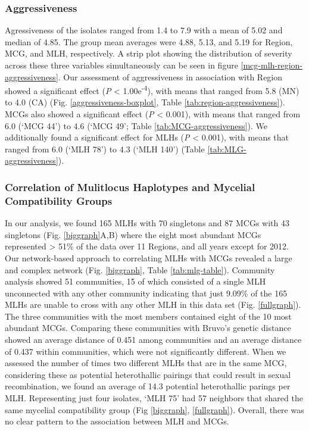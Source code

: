 \documentclass[fleqn,10pt,lineno]{wlpeerj} %
\theoremstyle{definition}
\theoremstyle{definition}
\theoremstyle{definition}
\theoremstyle{remark}
\begin{document}
\subsubsection*{Aggressiveness}\label{aggressiveness-1}

Agressiveness of the isolates ranged from 1.4 to 7.9 with a mean of 5.02
and median of 4.85. The group mean averages were 4.88, 5.13, and 5.19
for Region, MCG, and MLH, respectively. A strip plot showing the
distribution of severity across these three variables simultaneously can
be seen in figure \ref{mcg-mlh-region-aggressiveness}. Our assessment of
aggressiveness in association with Region showed a significant effect
(\emph{P} \textless{} 1.00e\textsuperscript{-4}), with means that ranged
from 5.8 (MN) to 4.0 (CA) (Fig. \ref{aggressiveness-boxplot}, Table
\ref{tab:region-aggressiveness}). MCGs also showed a significant effect
(\emph{P} \textless{} 0.001), with means that ranged from 6.0 (`MCG 44')
to 4.6 (`MCG 49'; Table \ref{tab:MCG-aggressiveness}). We additionally
found a significant effect for MLHs (\emph{P} \textless{} 0.001), with
means that ranged from 6.0 (`MLH 78') to 4.3 (`MLH 140') (Table
\ref{tab:MLG-aggressiveness}).

\subsubsection*{Correlation of Mulitlocus Haplotypes and Mycelial
Compatibility
Groups}\label{correlation-of-mulitlocus-haplotypes-and-mycelial-compatibility-groups}

In our analysis, we found 165 MLHs with 70 singletons and 87 MCGs with
43 singletons (Fig. \ref{biggraph}A,B) where the eight most abundant
MCGs represented \textgreater{} 51\% of the data over 11 Regions, and
all years except for 2012. Our network-based approach to correlating
MLHs with MCGs revealed a large and complex network (Fig.
\ref{biggraph}, Table \ref{tab:mlg-table}). Community analysis showed 51
communities, 15 of which consisted of a single MLH unconnected with any
other community indicating that just 9.09\% of the 165 MLHs are unable
to cross with any other MLH in this data set (Fig. \ref{fullgraph}). The
three communities with the most members contained eight of the 10 most
abundant MCGs. Comparing these communities with Bruvo's genetic distance
showed an average distance of 0.451 among communities and an average
distance of 0.437 within communities, which were not significantly
different. When we assessed the number of times two different MLHs that
are in the same MCG, considering these as potential heterothallic
pairings that could result in sexual recombination, we found an average
of 14.3 potential heterothallic parings per MLH. Representing just four
isolates, `MLH 75' had 57 neighbors that shared the same mycelial
compatibility group (Fig \ref{biggraph}, \ref{fullgraph}). Overall,
there was no clear pattern to the association between MLH and MCGs.
\end{document}
